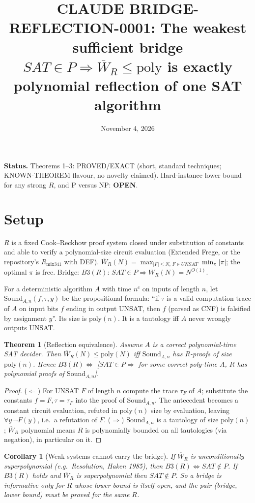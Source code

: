 \documentclass[11pt]{article}
\title{CLAUDE BRIDGE-REFLECTION-0001: The weakest sufficient bridge $SAT\in P\Rightarrow \overline W_R\le \mathrm{poly}$ is exactly polynomial reflection of one SAT algorithm}
\date{November 4, 2026}
\newtheorem{theorem}{Theorem}\newtheorem{corollary}{Corollary}
\begin{document}
\maketitle
\noindent\textbf{Status.} Theorems 1--3: PROVED/EXACT (short, standard techniques; KNOWN-THEOREM flavour, no novelty claimed). Hard-instance lower bound for any strong $R$, and P versus NP: \textbf{OPEN}.

\section*{Setup}
$R$ is a fixed Cook--Reckhow proof system closed under substitution of constants and able to verify a polynomial-size circuit evaluation (Extended Frege, or the repository's $R_{\mathrm{mix341}}$ with DEF). $\overline W_R(N)=\max_{|F|\le N,\,F\in UNSAT}\min_{\pi}|\pi|$; the optimal $\pi$ is free. Bridge: $B3(R)$: $SAT\in P\Rightarrow \overline W_R(N)=N^{O(1)}$.

For a deterministic algorithm $A$ with time $n^c$ on inputs of length $n$, let $\mathrm{Sound}_{A,n}(f,\tau,y)$ be the propositional formula: ``if $\tau$ is a valid computation trace of $A$ on input bits $f$ ending in output UNSAT, then $f$ (parsed as CNF) is falsified by assignment $y$''. Its size is $\mathrm{poly}(n)$. It is a tautology iff $A$ never wrongly outputs UNSAT.

\begin{theorem}[Reflection equivalence]
Assume $A$ is a correct polynomial-time SAT decider. Then $\overline W_R(N)\le \mathrm{poly}(N)$ iff $\mathrm{Sound}_{A,n}$ has $R$-proofs of size $\mathrm{poly}(n)$. Hence $B3(R)\iff$ [$SAT\in P\Rightarrow$ for some correct poly-time $A$, $R$ has polynomial proofs of $\mathrm{Sound}_{A,n}$].
\end{theorem}
\begin{proof}
($\Leftarrow$) For UNSAT $F$ of length $n$ compute the trace $\tau_F$ of $A$; substitute the constants $f=F,\tau=\tau_F$ into the proof of $\mathrm{Sound}_{A,n}$. The antecedent becomes a constant circuit evaluation, refuted in $\mathrm{poly}(n)$ size by evaluation, leaving $\forall y\,\neg F(y)$, i.e.\ a refutation of $F$. ($\Rightarrow$) $\mathrm{Sound}_{A,n}$ is a tautology of size $\mathrm{poly}(n)$; $\overline W_R$ polynomial means $R$ is polynomially bounded on all tautologies (via negation), in particular on it.
\end{proof}

\begin{corollary}[Weak systems cannot carry the bridge]
If $\overline W_R$ is unconditionally superpolynomial (e.g.\ Resolution, Haken 1985), then $B3(R)\iff SAT\notin P$. If $B3(R)$ holds and $\overline W_R$ is superpolynomial then $SAT\notin P$. So a bridge is informative only for $R$ whose lower bound is itself open, and the pair (bridge, lower bound) must be proved for the \emph{same} $R$.
\end{corollary}
\end{document}
